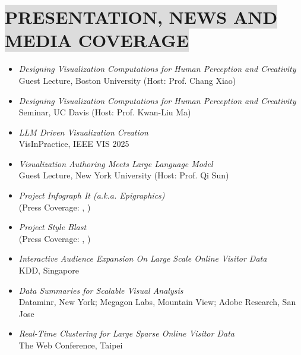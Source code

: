 \section*{
    \colorbox{gainsboro}{PRESENTATION, NEWS AND MEDIA COVERAGE}
}
\begin{itemize}[leftmargin=16.5mm,labelsep=9mm,noitemsep]
    \item[2026] \textit{Designing Visualization Computations for Human Perception and Creativity} \\ Guest Lecture, Boston University (Host: Prof. Chang Xiao)
    \item[2026] \textit{Designing Visualization Computations for Human Perception and Creativity} \\ Seminar, UC Davis (Host: Prof. Kwan-Liu Ma)
    \item[2025] \textit{LLM Driven Visualization Creation} \\ VisInPractice, IEEE VIS 2025
    \item[2024] \textit{Visualization Authoring Meets Large Language Model} \\ Guest Lecture, New York University (Host: Prof. Qi Sun)
    \item[2024] \textit{Project Infograph It (a.k.a. Epigraphics)} \\  (Press Coverage: , )
    \item[2022] \textit{Project Style Blast} \\  (Press Coverage: , )
    \item[2021] \textit{Interactive Audience Expansion On Large Scale Online Visitor Data} \\ KDD, Singapore
     \item[2021] \textit{Data Summaries for Scalable Visual Analysis} \\ Dataminr, New York; Megagon Labs, Mountain View; Adobe Research, San Jose
    \\ 
    \item[2020] \textit{Real-Time Clustering for Large Sparse Online Visitor Data} \\ The Web Conference, Taipei

\end{itemize}
